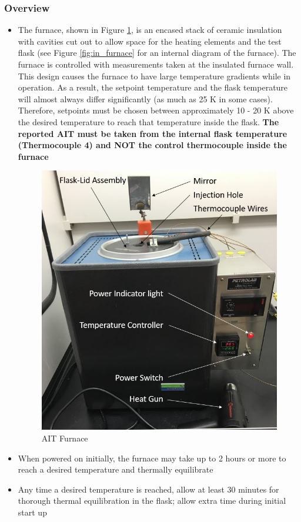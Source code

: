 \documentclass[letterpaper,11pt]{article}
\begin{document}
    	\subsubsection{Overview}
    \begin{itemize}
    \item The furnace, shown in Figure \ref{fig:furnace_pic}, is an encased 
        stack of ceramic insulation with cavities 
        cut out to allow space for the heating elements and the test flask
        (see Figure \ref{fig:in_furnace} for an internal diagram of the 
        furnace). The furnace is controlled with measurements taken at the 
        insulated furnace wall. This design causes the furnace to have
        large temperature gradients while in operation. As a result, the 
        setpoint temperature and the flask temperature will almost always 
        differ significantly (as much as 25 K in some cases). Therefore, 
        setpoints must be chosen between approximately 10 - 20 K above the 
        desired temperature to reach that temperature inside the flask.
        \textbf{The reported AIT must be taken from the internal flask 
        temperature (Thermocouple 4) and NOT the control thermocouple inside
        the furnace}
    
    \begin{figure}[H]
    \centering
    \includegraphics[width=.45\textwidth]{Furnace_pic_diagram.jpg}
    \caption{AIT Furnace}
    \label{fig:furnace_pic}
    \end{figure}
    
    \item When powered on initially, the furnace may take up to 2 hours or more  
        to reach a desired temperature and thermally equilibrate
    \item Any time a desired temperature is reached, allow at least 30 
        minutes for thorough thermal equilibration in the flask; allow extra 
        time during initial start up
     
     \end{itemize}
\end{document}
